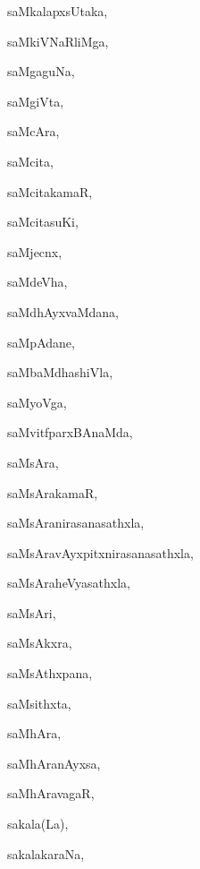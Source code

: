 \begin{multicols}{3}
{\noindent
{saMkalapxsUtaka}, \pageref{saMkalapxsUtaka}

\noindent
{saMkiVNaRliMga}, \pageref{saMkiVNaRliMga}

\noindent
{saMgaguNa}, \pageref{saMgaguNa}

\noindent
{saMgiVta}, \pageref{saMgiVta}

\noindent
{saMcAra}, \pageref{saMcAra}

\noindent
{saMcita}, \pageref{saMcita}

\noindent
{saMcitakamaR}, \pageref{saMcitakamaR}

\noindent
{saMcitasuKi}, \pageref{saMcitasuKi}

\noindent
{saMjecnx}, \pageref{saMjecnx}

\noindent
{saMdeVha}, \pageref{saMdeVha}

\noindent
{saMdhAyxvaMdana}, \pageref{saMdhAyxvaMdana}

\noindent
{saMpAdane}, \pageref{saMpAdane}

\noindent
{saMbaMdhashiVla}, \pageref{saMbaMdhashiVla}

\noindent
{saMyoVga}, \pageref{saMyoVga}

\noindent
{saMvitfparxBAnaMda}, \pageref{saMvitfparxBAnaMda}

\noindent
{saMsAra}, \pageref{saMsAra}

\noindent
{saMsArakamaR}, \pageref{saMsArakamaR}

\noindent
{saMsAranirasanasathxla}, \pageref{saMsAranirasanasathxla}

\noindent
{saMsAravAyxpitxnirasanasathxla}, \pageref{saMsAravAyxpitxnirasanasathxla}

\noindent
{saMsAraheVyasathxla}, \pageref{saMsAraheVyasathxla}

\noindent
{saMsAri}, \pageref{saMsAri}

\noindent
{saMsAkxra}, \pageref{saMsAkxra}

\noindent
{saMsAthxpana}, \pageref{saMsAthxpana}

\noindent
{saMsithxta}, \pageref{saMsithxta}

\noindent
{saMhAra}, \pageref{saMhAra}

\noindent
{saMhAranAyxsa}, \pageref{saMhAranAyxsa}

\noindent
{saMhAravagaR}, \pageref{saMhAravagaR}

\noindent
{sakala(La)}, \pageref{sakalaLa}

\noindent
{sakalakaraNa}, \pageref{sakalakaraNa}

}
\end{multicols}
